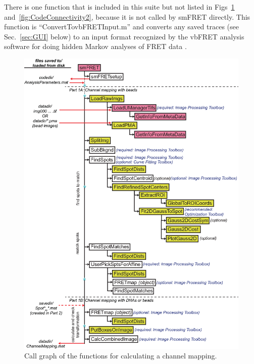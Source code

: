 \documentclass[11pt]{article}
\begin{document}
There is one function that is included in this suite but not listed in Figs~\ref{fig:CodeConnectivity1} and~\ref{fig:CodeConnectivity2}, because it is not called by smFRET directly.  This function is ``ConvertTovbFRETInput.m'' and converts any saved traces (see Sec.~\ref{sec:GUI} below) to an input format recognized by the vbFRET analysis software for doing hidden Markov analyses of FRET data \cite{Bronson2009}.

\begin{figure}[!p]
\begin{center}
\includegraphics[width=6in]{CodeFlowchart.eps}
\caption{Call graph of the functions for calculating a channel mapping.}
\label{fig:CodeConnectivity1}
\end{center}
\end{figure}
\end{document}

